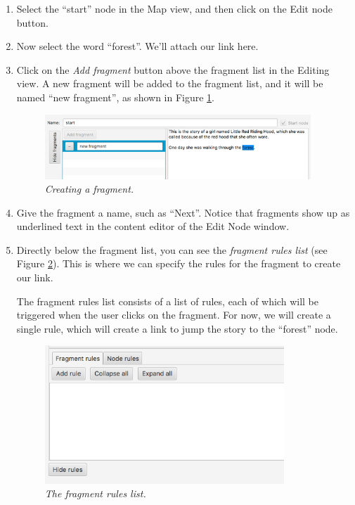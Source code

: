 \documentclass{article}
\begin{document}
\begin{enumerate}
  \item Select the ``start'' node in the Map view, and then click on the Edit node button.
  \item Now select the word ``forest''. We'll attach our link here.
  \item Click on the \textit{Add fragment} button above the fragment list in the Editing view. A new fragment will be added to the fragment list, and it will be named ``new fragment'', as shown in Figure \ref{fig:tut1:create_link}.

\begin{figure}[ht]
  \centering
  \includegraphics[width=10cm]{images/hypedyn-tutorial-1-figure-7}
  \caption{\textit{Creating a fragment.}}
  \label{fig:tut1:create_link}
\end{figure} 

\item Give the fragment a name, such as ``Next''. Notice that fragments show up as underlined text in the content editor of the Edit Node window.
\item Directly below the fragment list, you can see the \textit{fragment rules list} (see Figure \ref{fig:tut1:edit_link_1}). This is where
we can specify the rules for the fragment to create our link.

The fragment rules list consists of a list of rules, each of which will be triggered when the user clicks on the fragment. For now, we will create a single rule, which will create a link to jump the story to the ``forest'' node.

\begin{figure}[ht]
  \centering
  \includegraphics[width=9cm]{images/hypedyn-tutorial-1-figure-8}
  \caption{\textit{The fragment rules list.}}
  \label{fig:tut1:edit_link_1}
\end{figure} 


\end{enumerate}
\end{document}
